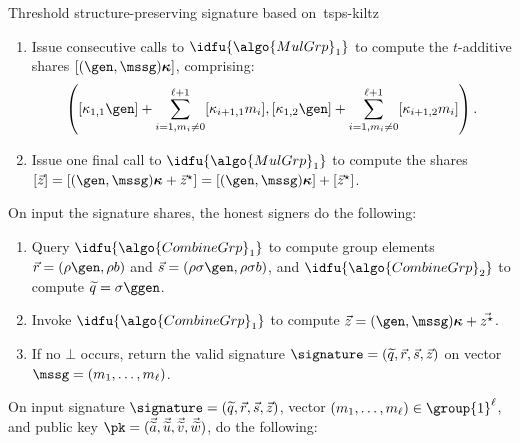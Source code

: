 \begin{protocolbox}{Threshold structure-preserving signature based
  on~\cite{C:KilPanWee15}}{tsps-kiltz}
\begin{description}
\begin{enumerate}
    \item Issue consecutive calls to $\idfu{\algo{MulGrp}_1}$ to compute the
      $t$-additive shares $\lbrack (\gen, \mssg)\boldsymbol{\kappa}\rbrack $,
      comprising:
      \begin{equation*}
        \left(\lbrack \kappa_{1, 1}\gen\rbrack  + \sum_{i=1, {m}_i \neq
        0}^{\ell+1} \lbrack \kappa_{i+1, 1}{m}_i\rbrack  , \lbrack \kappa_{1,
      2}\gen\rbrack  + \sum_{i=1, {m}_i \neq 0}^{\ell+1} \lbrack \kappa_{i+1,
    2}{m}_i\rbrack \right).
  \end{equation*}

\item Issue one final call to $\idfu{\algo{MulGrp}_1}$ to compute the shares
  $\lbrack \vec{{z}}\rbrack  = \lbrack (\gen, \mssg)\boldsymbol{\kappa} +
  \vec{{z}}^{\star}\rbrack  = \lbrack (\gen, \mssg)\boldsymbol{\kappa}\rbrack
  + \lbrack \vec{{z}}^{\star}\rbrack $.

\end{enumerate}

\item[$\signature \leftarrow \TSPScombine(\lbrack \signature\rbrack )$ :] On
  input the signature shares, the honest signers do the following:

  \begin{enumerate}

    \item Query $\idfu{\algo{CombineGrp}_1}$ to compute group elements
      $\vec{{r}} = (\rho\gen, \rho{b})$ and $\vec{{s}} = (\rho\sigma\gen,
      \rho\sigma{b})$, and $\idfu{\algo{CombineGrp}_2}$ to compute
      $\widetilde{q} = \sigma\ggen$.

    \item Invoke $\idfu{\algo{CombineGrp}_1}$ to compute $\vec{{z}}= (\gen,
      \mssg)\boldsymbol{\kappa} + \vec{{z}^{\star}}$.

    \item If no $\bot$ occurs, return the valid signature $\signature =
      (\widetilde{q}, \vec{{r}}, \vec{{s}}, \vec{{z}})$ on vector $\mssg =
      ({m}_1, \ldots, {m}_\ell)$.

  \end{enumerate}

\item[$\{0,1\} \leftarrow \SPSverify(\pk, \mssg, \signature)$ :] On input
  signature $\signature = (\widetilde{q}, \vec{{r}}, \vec{{s}}, \vec{{z}})$,
  vector $({m}_1, \ldots,{m}_\ell) \in \group{1}^\ell$, and public key $\pk
  =(\vec{\widetilde{a}}, \vec{\widetilde{u}},
  \vec{\widetilde{v}},\vec{\widetilde{w}})$, do the following:


\end{description}
\end{protocolbox}
